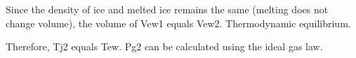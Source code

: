 Since the density of ice and melted ice remains the same (melting does not change volume),  
the volume of Vew1 equals Vew2. Thermodynamic equilibrium.  

Therefore, Tj2 equals Tew. Pg2 can be calculated using the ideal gas law.